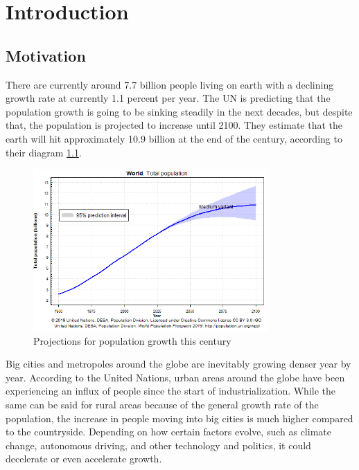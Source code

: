 
\chapter{Introduction}\label{chapter:introduction}
\section{Motivation}

There are currently around 7.7 billion people living on earth with a declining growth rate at currently 1.1 percent per year. The UN is predicting that the population growth is going to be sinking steadily in the next decades, but despite that, the population is projected to increase until 2100. They estimate that the earth will hit approximately 10.9 billion at the end of the century, according to their diagram \ref{fig:population}.

\begin{figure}[htpb]
  \centering
  \includegraphics[width=0.8\textwidth]{figures/population.png}
  \caption{Projections for population growth this century} \label{fig:population}
\end{figure}


Big cities and metropoles around the globe are inevitably growing denser year by year. According to the United Nations, urban areas around the globe have been experiencing an influx of people since the start of industrialization. While the same can be said for rural areas because of the general growth rate of the population, the increase in people moving into big cities is much higher compared to the countryside.
Depending on how certain factors evolve, such as climate change, autonomous driving, and other technology and politics, it could decelerate or even accelerate growth.

